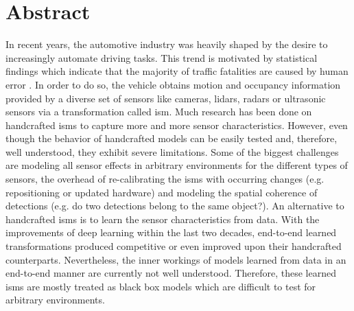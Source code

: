 \section*{Abstract}
\label{ch:abstract}
In recent years, the automotive industry was heavily shaped by the desire to increasingly automate driving tasks. This trend is motivated by statistical findings which indicate that the majority of traffic fatalities are caused by human error \cite{world2018global}. In order to do so, the vehicle obtains motion and occupancy information provided by a diverse set of sensors like cameras, lidars, radars or ultrasonic sensors via a transformation called \gls{ism}. Much research has been done on handcrafted \gls{ism}s to capture more and more sensor characteristics. However, even though the behavior of handcrafted models can be easily tested and, therefore, well understood, they exhibit severe limitations. Some of the biggest challenges are modeling all sensor effects in arbitrary environments for the different types of sensors, the overhead of re-calibrating the \gls{ism}s with occurring changes (e.g. repositioning or updated hardware) and modeling the spatial coherence of detections (e.g. do two detections belong to the same object?). An alternative to handcrafted \gls{ism}s is to learn the sensor characteristics from data. With the improvements of deep learning within the last two decades, end-to-end learned transformations produced competitive or even improved upon their handcrafted counterparts. Nevertheless, the inner workings of models learned from data in an end-to-end manner are currently not well understood. Therefore, these learned \gls{ism}s are mostly treated as black box models which are difficult to test for arbitrary environments.
\\\\
